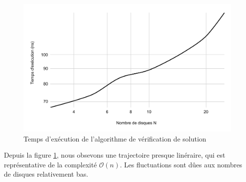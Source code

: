 \begin{figure}[H]
    \centering
        \includegraphics[scale=0.6]{./ressources/temps_execution_algo_verification.pdf}
        \caption{Temps d'exécution de l'algorithme de vérification de solution}
    \label{fig:temps_exec_algo_verification}
\end{figure}
\par
Depuis la figure \ref{fig:temps_exec_algo_verification}, nous obsevons une trajectoire presque linéraire, qui est représentative de la complexité $\mathcal{O}(n)$. Les fluctuations sont dûes aux nombres de disques relativement bas.
